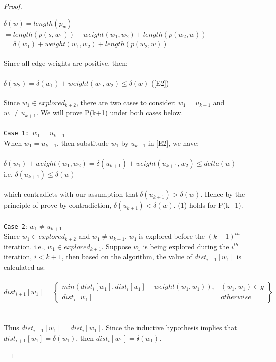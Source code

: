 \begin{proof}
\begin{itemize}
    \tab\tsp $\delta(w) = length(p_w)$ \\
    \tab\tab $= length(p(s, w_1)) + weight(w_1, w_2) + length(p(w_2, w))$ \\
    \tab\tab $= \delta(w_1) + weight(w_1, w_2) + length(p(w_2, w))$
  \\\\
  Since all edge weights are positive, then: 
  \\\\
    \tab $\delta(w_2) = \delta(w_1) + weight(w_1, w_2) \leq \delta(w)$ ([E2])
  \\\\
  Since $w_1 \in explored_{k+2}$, there are two cases to consider: $w_1 =u_{k+1}$ and $w_1 \neq u_{k+1}$. We will prove P(k+1) under both cases below. 
  \\\\
  \texttt{Case 1: $w_1 = u_{k+1}$}
  \\
  When $w_1 = u_{k+1}$, then substitude $w_1$ by $u_{k+1}$ in [E2], we have: 
  \\\\
    \tab $\delta(w_1) + weight(w_1, w_2) = \delta(u_{k+1}) + weight(u_{k+1}, w_2) \leq delta(w)$\\
    \tab i.e.  $\delta(u_{k+1}) \leq \delta(w)$ 
  \\\\
  which contradicts with our assumption that $\delta(u_{k+1}) > \delta(w)$. Hence by the principle of prove by contradiction, $\delta(u_{k+1}) < \delta(w)$. (1) holds for P(k+1). 
  \\\\
  \texttt{Case 2}: $w_1 \neq u_{k+1}$
  \\ 
  Since $w_1 \in explored_{k+2}$ and $w_1 \neq u_{k+1}$, $w_1$ is explored before the $(k+1)^{th}$ iteration. i.e., $w_1 \in explored_{k+1}$. Suppose $w_1$ is being explored during the $i^{th}$ iteration, $i < k+1$, then based on the algorithm, the value of $dist_{i+1}[w_1]$ is calculated as: 
  \\\\
  \tab\[
        dist_{i+1}[w_1] = \left.
       \begin{cases} 
          min(dist_{i}[w_1], dist_{i}[w_1] + weight(w_1,w_1)), & (w_1,w_1) \in g \\ 
          dist_{i}[w_1] & otherwise 
        \end{cases}
        \right\}
      \]
  \\\\
  Thus $dist_{i+1}[w_1] = dist_i[w_1]$. Since the inductive hypothesis implies that $dist_{i+1}[w_1] = \delta(w_1)$, then $dist_i[w_1] = \delta(w_1)$. 

\end{itemize}
\end{proof}
